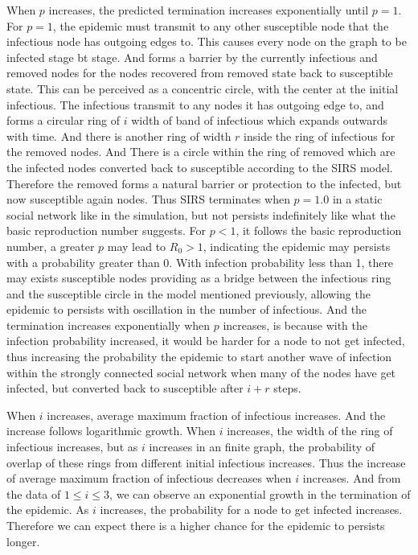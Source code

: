 \documentclass{subfile}
\begin{document}
  When \(p\) increases, the predicted termination increases exponentially until \(p=1\). For \(p=1\), the epidemic must transmit to any other susceptible node that the infectious node has outgoing edges to. This causes every node on the graph to be infected stage bt stage. And forms a barrier by the currently infectious and removed nodes for the nodes recovered from removed state back to susceptible state. This can be perceived as a concentric circle, with the center at the initial infectious. The infectious transmit to any nodes it has outgoing edge to, and forms a circular ring of \(i\) width of band of infectious which expands outwards with time. And there is another ring of width \(r\) inside the ring of infectious for the removed nodes. And There is a circle within the ring of removed which are the infected nodes converted back to susceptible according to the SIRS model. Therefore the removed forms a natural barrier or protection to the infected, but now susceptible again nodes. Thus SIRS terminates when \(p=1.0\) in a static social network like in the simulation, but not persists indefinitely like what the basic reproduction number suggests. For \(p<1\), it follows the basic reproduction number, a greater \(p\) may lead to \(R_0>1\), indicating the epidemic may persists with a probability greater than 0. With infection probability less than 1, there may exists susceptible nodes providing as a bridge between the infectious ring and the susceptible circle in the model mentioned previously, allowing the epidemic to persists with oscillation in the number of infectious. And the termination increases exponentially when \(p\) increases, is because with the infection probability increased, it would be harder for a node to not get infected, thus increasing the probability the epidemic to start another wave of infection within the strongly connected social network when many of the nodes have get infected, but converted back to susceptible after \(i+r\) steps.

  When \(i\) increases, average maximum fraction of infectious increases. And the increase follows logarithmic growth. When \(i\) increases, the width of the ring of infectious increases, but as \(i\) increases in an finite graph, the probability of overlap of these rings from different initial infectious increases. Thus the increase of average maximum fraction of infectious decreases when \(i\) increases. And from the data of \(1\leq i \leq 3\), we can observe an exponential growth in the termination of the epidemic. As \(i\) increases, the probability for a node to get infected increases. Therefore we can expect there is a higher chance for the epidemic to persists longer.
\end{document}

